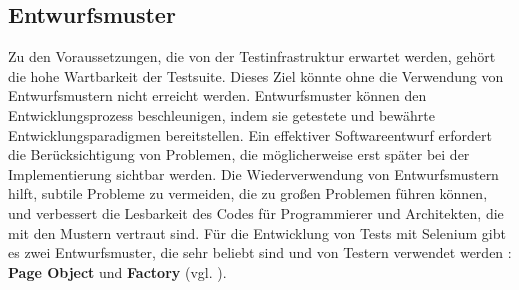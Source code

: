 \subsection{Entwurfsmuster}\label{subsec:entwurfsmuster}


Zu den Voraussetzungen, die von der Testinfrastruktur erwartet werden,
gehört die hohe Wartbarkeit der Testsuite. Dieses Ziel könnte ohne die
Verwendung von Entwurfsmustern nicht erreicht werden. Entwurfsmuster
können den Entwicklungsprozess beschleunigen, indem sie getestete und bewährte
Entwicklungsparadigmen bereitstellen. Ein effektiver Softwareentwurf
erfordert die Berücksichtigung von Problemen, die möglicherweise erst
später bei der Implementierung sichtbar werden. Die Wiederverwendung von
Entwurfsmustern hilft, subtile Probleme zu vermeiden, die zu großen
Problemen führen können, und verbessert die Lesbarkeit des Codes für
Programmierer und Architekten, die mit den Mustern vertraut sind.  Für die
Entwicklung von Tests mit Selenium gibt es zwei Entwurfsmuster, die sehr
beliebt sind und von Testern verwendet werden :
\textbf{Page Object} und \textbf{Factory} (vgl. \cite{pattern-browser}).




